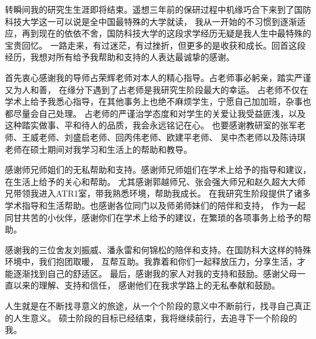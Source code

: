 

\begin{ack}
  转瞬间我的研究生生涯即将结束。遥想三年前的保研过程中机缘巧合下来到了国防科技大学这一可以说是全中国最特殊的大学就读，
  我从一开始的不习惯到逐渐适应，再到现在的依依不舍，国防科技大学的这段求学经历无疑是我人生中最特殊的宝贵回忆。
  一路走来，有过迷茫，有过挫折，但更多的是收获和成长。回首这段经历，我想对所有给予我帮助和支持的人表达最诚挚的感谢。

  首先衷心感谢我的导师占荣辉老师对本人的精心指导。占老师事必躬亲，踏实严谨又为人和善，
  在缘分下遇到了占老师是我研究生阶段最大的幸运。
  占老师不仅在学术上给予我悉心指导，在其他事务上也绝不麻烦学生，宁愿自己加加班，杂事也都尽量会自己处理。
  占老师的严谨治学态度和对学生的关爱让我受益匪浅，以及这种踏实做事、平和待人的品质，我会永远铭记在心。
  也要感谢教研室的张军老师、王威老师、刘盛启老师、回丙伟老师、欧建平老师、
  吴中杰老师以及陈诗琪老师在硕士期间对我学习和生活上的帮助和教导。

  感谢师兄师姐们的无私帮助和支持。感谢师兄师姐们在学术上给予的指导和建议，在生活上给予的关心和帮助。
  尤其感谢郭越师兄、张会强大师兄和赵久超大大师兄带领我进入ATR1室，带我熟悉环境，帮助我成长。
  在我研究生阶段提供了诸多学术指导和生活帮助。也感谢各位同门以及师弟师妹们的陪伴和支持，
  作为一起同甘共苦的小伙伴，感谢你们在学术上给予的建议，在繁琐的各项事务上给予的帮助。

  感谢我的三位舍友刘振威、潘永雷和何锦松的陪伴和支持。在国防科大这样的特殊环境中，我们抱团取暖，
  互帮互助。我靠着和你们一起释放压力，分享生活，才能逐渐找到自己的舒适区。
  最后，感谢我的家人对我的支持和鼓励。感谢父母一直以来的理解、支持和信任，
  感谢他们在我求学路上的无私奉献和鼓励。

  人生就是在不断找寻意义的旅途，从一个个阶段的意义中不断前行，找寻自己真正的人生意义。
  硕士阶段的目标已经结束，我将继续前行，去追寻下一个阶段的我。

\end{ack}
